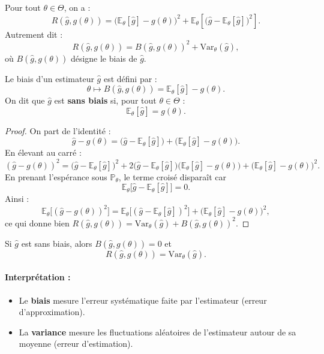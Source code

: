 \begin{mdframed}
\begin{proposition}
Pour tout $\theta \in \Theta$, on a :
\[
R(\hat{g}, g(\theta)) 
= \big( \mathbb{E}_\theta[\hat{g}] - g(\theta) \big)^2 
+ \mathbb{E}_\theta\!\left[ \big(\hat{g} - \mathbb{E}_\theta[\hat{g}]\big)^2 \right].
\]
Autrement dit :
\[
R(\hat{g}, g(\theta)) = B(\hat{g}, g(\theta))^2 + \mathrm{Var}_\theta(\hat{g}),
\]
où $B(\hat{g}, g(\theta))$ désigne le biais de $\hat{g}$.
\end{proposition}
\end{mdframed}

\begin{definition}[Biais]
Le biais d'un estimateur $\hat{g}$ est défini par :
\[
\theta \mapsto B(\hat{g}, g(\theta)) = \mathbb{E}_\theta[\hat{g}] - g(\theta).
\]
On dit que $\hat{g}$ est \textbf{sans biais} si, pour tout $\theta \in \Theta$ :
\[
\mathbb{E}_\theta[\hat{g}] = g(\theta).
\]
\end{definition}

\begin{proof}
On part de l'identité :
\[
\hat{g} - g(\theta)
= \big( \hat{g} - \mathbb{E}_\theta[\hat{g}] \big)
+ \big( \mathbb{E}_\theta[\hat{g}] - g(\theta) \big).
\]
En élevant au carré :
\[
(\hat{g} - g(\theta))^2
= \big(\hat{g} - \mathbb{E}_\theta[\hat{g}]\big)^2
+ 2\big(\hat{g} - \mathbb{E}_\theta[\hat{g}]\big)\big(\mathbb{E}_\theta[\hat{g}] - g(\theta)\big)
+ \big(\mathbb{E}_\theta[\hat{g}] - g(\theta)\big)^2.
\]
En prenant l'espérance sous $\mathbb{P}_\theta$, le terme croisé disparaît car
\[
\mathbb{E}_\theta\big[\hat{g} - \mathbb{E}_\theta[\hat{g}]\big] = 0.
\]
Ainsi :
\[
\mathbb{E}_\theta\big[(\hat{g} - g(\theta))^2\big]
= \mathbb{E}_\theta\big[(\hat{g} - \mathbb{E}_\theta[\hat{g}])^2\big]
+ \big(\mathbb{E}_\theta[\hat{g}] - g(\theta)\big)^2,
\]
ce qui donne bien $R(\hat{g}, g(\theta)) = \mathrm{Var}_\theta(\hat{g}) + B(\hat{g}, g(\theta))^2$.
\end{proof}

\begin{remarque}
Si $\hat{g}$ est sans biais, alors $B(\hat{g}, g(\theta)) = 0$ et
\[
R(\hat{g}, g(\theta)) = \mathrm{Var}_\theta(\hat{g}).
\]
\end{remarque}

\paragraph{Interprétation :}
\begin{itemize}
  \item Le \textbf{biais} mesure l'erreur systématique faite par l'estimateur (erreur d'approximation).
  \item La \textbf{variance} mesure les fluctuations aléatoires de l'estimateur autour de sa moyenne (erreur d'estimation).
\end{itemize}

